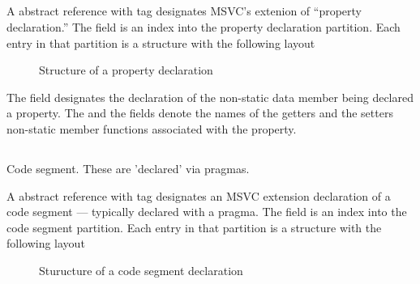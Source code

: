 


\subsection{}
\label{sec:ifc:DeclSort:Property}

A  abstract reference with tag 
designates MSVC's extenion of ``property declaration.''  The 
field is an index into the property declaration partition.  Each entry in that partition
is a structure with the following layout
%
\begin{figure}[H]
	\centering
	\caption{Structure of a property declaration}
	\label{fig:ifc-property-declaration-structure}
\end{figure}
%
The  field designates the declaration of the non-static data member
being declared a property.  The  and the  fields 
denote the names of the getters and the setters non-static member functions associated
with the property.




\subsection{}
\label{sec:ifc:DeclSort:OutputSegment}

 Code segment. These are 'declared' via pragmas.

 A  abstract reference with tag 
 designates an MSVC extension declaration of a code segment --- typically declared with a pragma.
 The  field is an index into the code segment partition.  Each entry
 in that partition is a structure with the following layout
 \begin{figure}[H]
	\centering
	\caption{Sturucture of a code segment declaration}
	\label{fig:ifc-code-segment-structure}
 \end{figure}

